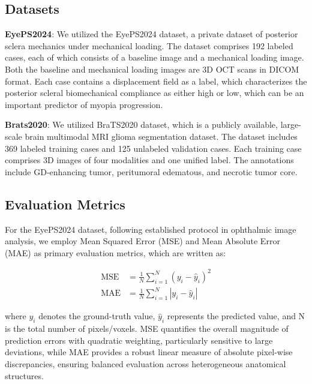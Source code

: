 \documentclass[AMA,Times1COL]{WileyNJDv5} %
\begin{document}
\subsection{Datasets}
\textbf{EyePS2024}: We utilized the EyePS2024 dataset, a private dataset of posterior sclera mechanics under mechanical loading. The dataset comprises 192 labeled cases, each of which consists of a baseline image and a mechanical loading image. Both the baseline and mechanical loading images are 3D OCT scans in DICOM format. Each case contains a displacement field as a label, which characterizes the posterior scleral biomechanical compliance as either high or low, which can be an important predictor of myopia progression.

\textbf{Brats2020}: We utilized BraTS2020 dataset\cite{menze2014multimodal-brats1}\cite{bakas2017advancing-brats2}, which is a publicly available, large-scale brain multimodal MRI glioma segmentation dataset. The dataset includes 369 labeled training cases and 125 unlabeled validation cases. Each training case comprises 3D images of four modalities and one unified label. The annotations include GD-enhancing tumor, peritumoral edematous, and necrotic tumor core.

\subsection{Evaluation Metrics}
For the EyePS2024 dataset, following established protocol in ophthalmic image analysis\cite{oh2024prediction}, we employ Mean Squared Error (MSE) and Mean Absolute Error (MAE) as primary evaluation metrics, which are written as:

\begin{equation}
\begin{aligned}
    \text{MSE} &= \frac{1}{N}\sum_{i=1}^{N}(y_i - \hat{y}_i)^2 \\
    \text{MAE} &= \frac{1}{N}\sum_{i=1}^{N}|y_i - \hat{y}_i|
\end{aligned}
\end{equation}

where $y_i$ denotes the ground-truth value, $\hat{y}_i$ represents the predicted value, and N is the total number of pixels/voxels. MSE quantifies the overall magnitude of prediction errors with quadratic weighting, particularly sensitive to large deviations, while MAE provides a robust linear measure of absolute pixel-wise discrepancies, ensuring balanced evaluation across heterogeneous anatomical structures.
\end{document}
